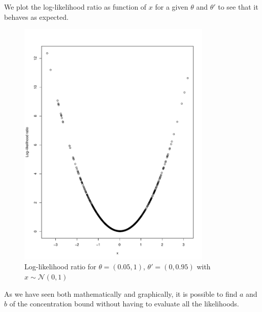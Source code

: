 We plot the log-likelihood ratio as function of $x$ for a given $\theta$ and $\theta'$ to see that it behaves as expected. 
\begin{figure}[H]
    \centering
    \includegraphics[scale = 0.6, height=12cm]{figures/loglik_ratio1.pdf}
    \caption{Log-likelihood ratio for $\theta = \left(0.05, 1\right)$, $\theta' = \left(0, 0.95\right)$  with $x \sim \mathcal{N}\left(0,1\right)$}
    \label{fig:loglik_ratio_gaussian}
\end{figure}
As we have seen both mathematically and graphically, it is possible to find $a$ and $b$ of the concentration bound without having to evaluate all the likelihoods. 

